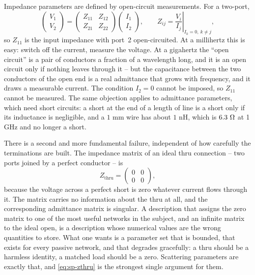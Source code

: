 Impedance parameters are defined by open-circuit measurements. For a two-port,
\begin{equation}
  \begin{pmatrix} V_1 \\ V_2 \end{pmatrix}
  =
  \begin{pmatrix} Z_{11} & Z_{12} \\ Z_{21} & Z_{22} \end{pmatrix}
  \begin{pmatrix} I_1 \\ I_2 \end{pmatrix},
  \qquad
  Z_{ij} = \left.\frac{V_i}{I_j}\right|_{I_k=0,\ k\neq j} ,
  \label{eq:sp-zdef}
\end{equation}
so $Z_{11}$ is the input impedance with port~2 open-circuited. At a millihertz this is easy: switch off the
current, measure the voltage. At a gigahertz the ``open circuit'' is a pair of conductors a fraction of a
wavelength long, and it is an open circuit only if nothing leaves through it -- but the capacitance between the
two conductors of the open end is a real admittance that grows with frequency, and it draws a measurable current.
The condition $I_2=0$ cannot be imposed, so $Z_{11}$ cannot be measured. The same objection applies to
admittance parameters, which need short circuits: a short at the end of a length of line is a short only if its
inductance is negligible, and a $1$ mm wire has about $1$ nH, which is $6.3\ \Omega$ at 1 GHz and no longer a
short.

There is a second and more fundamental failure, independent of how carefully the terminations are built. The
impedance matrix of an ideal thru connection -- two ports joined by a perfect conductor -- is
\begin{equation}
  Z_{\mathrm{thru}} = \begin{pmatrix} 0 & 0 \\ 0 & 0 \end{pmatrix},
  \label{eq:sp-zthru}
\end{equation}
because the voltage across a perfect short is zero whatever current flows through it. The matrix carries no
information about the thru at all, and the corresponding admittance matrix is singular. A description that
assigns the zero matrix to one of the most useful networks in the subject, and an infinite matrix to the ideal
open, is a description whose numerical values are the wrong quantities to store. What one wants is a parameter
set that is bounded, that exists for every passive network, and that degrades gracefully: a thru should be a
harmless identity, a matched load should be a zero. Scattering parameters are exactly that, and
\eqref{eq:sp-zthru} is the strongest single argument for them.

